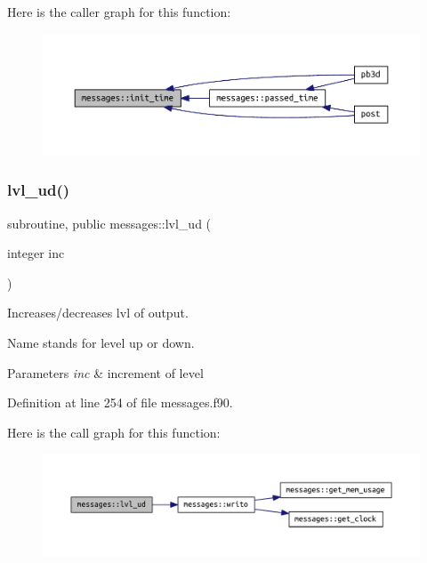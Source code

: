 Here is the caller graph for this function\+:\nopagebreak
\begin{figure}[H]
\begin{center}
\leavevmode
\includegraphics[width=350pt]{namespacemessages_a8ed785522aec7ac549263cdd54a8619a_icgraph}
\end{center}
\end{figure}
\mbox{\label{namespacemessages_a6e6bfb084063e4cc91ee86e542043302}} 
\subsubsection{\texorpdfstring{lvl\+\_\+ud()}{lvl\_ud()}}
{\footnotesize\ttfamily subroutine, public messages\+::lvl\+\_\+ud (\begin{DoxyParamCaption}\item[{integer}]{inc }\end{DoxyParamCaption})}



Increases/decreases {\ttfamily lvl} of output. 

Name stands for level up or down.


\begin{DoxyParams}{Parameters}
{\em inc} & increment of level \\
\hline
\end{DoxyParams}


Definition at line 254 of file messages.\+f90.

Here is the call graph for this function\+:\nopagebreak
\begin{figure}[H]
\begin{center}
\leavevmode
\includegraphics[width=350pt]{namespacemessages_a6e6bfb084063e4cc91ee86e542043302_cgraph}
\end{center}
\end{figure}
\mbox{\label{namespacemessages_a34da9df28502ccd63e62674d51fe8de8}} 

